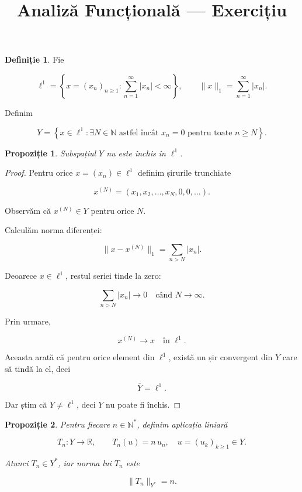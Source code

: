 \documentclass[12pt]{article}
\title{Analiză Funcțională — Exercițiu}
\author{}
\date{}
\theoremstyle{definition}
\newtheorem{definition}{Definiție}
\theoremstyle{plain}
\newtheorem{proposition}{Propoziție}
\begin{document}
\maketitle


\begin{definition}
Fie


\[
\ell^1 = \left\{ x = (x_n)_{n\ge 1} : \sum_{n=1}^\infty |x_n| < \infty \right\},
\qquad
\|x\|_1 = \sum_{n=1}^\infty |x_n|.
\]



Definim


\[
Y = \left\{ x \in \ell^1 : \exists N \in \mathbb{N} \text{ astfel încât } x_n = 0 \text{ pentru toate } n \ge N \right\}.
\]


\end{definition}

\begin{proposition}
Subspațiul $Y$ nu este închis în $\ell^1$.
\end{proposition}

\begin{proof}
Pentru orice $x = (x_n) \in \ell^1$ definim șirurile trunchiate


\[
x^{(N)} = (x_1, x_2, \dots, x_N, 0, 0, \dots).
\]


Observăm că $x^{(N)} \in Y$ pentru orice $N$.

Calculăm norma diferenței:


\[
\|x - x^{(N)}\|_1 = \sum_{n>N} |x_n|.
\]



Deoarece $x \in \ell^1$, restul seriei tinde la zero:


\[
\sum_{n>N} |x_n| \longrightarrow 0 \quad \text{când } N \to \infty.
\]



Prin urmare,


\[
x^{(N)} \to x \quad \text{în } \ell^1.
\]



Aceasta arată că pentru orice element din $\ell^1$, există un șir convergent din $Y$ care să tindă la el, deci


\[
\overline{Y} = \ell^1.
\]



Dar știm că $Y \ne \ell^1$, deci $Y$ nu poate fi închis.
\end{proof}

\begin{proposition}
Pentru fiecare $n \in \mathbb{N}^\ast$, definim aplicația liniară


\[
T_n : Y \to \mathbb{R}, \qquad T_n(u) = n\,u_n, \quad u = (u_k)_{k\ge 1} \in Y.
\]


Atunci $T_n \in Y^*$, iar norma lui $T_n$ este


\[
\|T_n\|_{Y^*} = n.
\]


\end{proposition}
\end{document}
